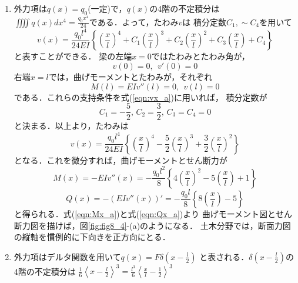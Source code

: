 \documentclass[10pt,a4j]{jbook}
\begin{document}
\begin{enumerate}
\item
外力項は$q(x)=q_0$(一定)で，$q(x)$の4階の不定積分は
$\iiiint q(x)dx^4=\frac{q_0x^4}{24}$である．よって，たわみ$v$は
積分定数$C_1,\sim C_4$を用いて
\begin{equation}
	v(x)= \frac{q_0l^4}{24EI}\left\{
		\left(\frac{x}{l}\right)^4
		+
		C_1
		\left(\frac{x}{l}\right)^3
		+
		C_2
		\left(\frac{x}{l}\right)^2
		+
		C_3
		\left(\frac{x}{l}\right)
		+
		C_4
	\right\}
	\label{eqn:vx_a}
\end{equation}
と表すことができる．
梁の左端$x=0$ではたわみとたわみ角が，
\begin{equation}
	v(0)=0, \ \ v'(0)=0
	\label{eqn:bcon_al}
\end{equation}
右端$x=l$では，曲げモーメントとたわみが，それぞれ
\begin{equation}
	M(l)=EIv''(l)=0, \ \ v(l)=0
	\label{eqn:bcon_al}
\end{equation}
である．これらの支持条件を式(\ref{eqn:vx_a})に用いれば，
積分定数が
\begin{equation}
	C_1=-\frac{5}{2}, \, 
	C_2=\frac{3}{2}, \,
	C_3=C_4=0
	\label{eqn:int_cnst}
\end{equation}
と決まる．以上より，たわみは
\begin{equation}
	v(x)= \frac{q_0l^4}{24EI}\left\{
		\left(\frac{x}{l}\right)^4
		-
		\frac{5}{2}
		\left(\frac{x}{l}\right)^3
		+
		\frac{3}{2}
		\left(\frac{x}{l}\right)^2
	\right\}
	\label{eqn:vx_a_sol}
\end{equation}
となる．これを微分すれば，曲げモーメントとせん断力が
\begin{equation}
	M(x)= 
	-EIv''(x)
	=
	-\frac{q_0l^2}{8}\left\{
		4
		\left(\frac{x}{l}\right)^2
		-
		5
		\left(\frac{x}{l}\right)
		+
		1
	\right\}
	\label{eqn:Mx_a}
\end{equation}
\begin{equation}
	Q(x)= 
	-\left(EIv''(x)\right)'
	=
	-\frac{q_0l}{8}\left\{
		8
		\left(\frac{x}{l}\right)
		-
		5
	\right\}
	\label{eqn:Qx_a}
\end{equation}
と得られる．式(\ref{eqn:Mx_a})と式(\ref{eqn:Qx_a})より
曲げモーメント図とせん断力図を描けば，図\ref{fig:fig8_4}-(a)のようになる．
土木分野では，断面力図の縦軸を慣例的に下向きを正方向にとる．
\item
外力項はデルタ関数を用いて$q(x)=F\delta\left(x-\frac{l}{2}\right)$
と表される．$\delta\left(x-\frac{l}{2}\right)$の4階の不定積分は
$\frac{1}{6}\left<x-\frac{l}{2}\right>^3=\frac{l^3}{6}\left<\frac{x}{l}-\frac{1}{2}\right>^3$

\end{enumerate}
\end{document}
